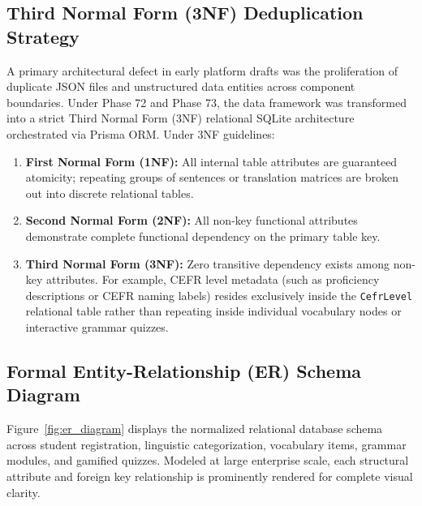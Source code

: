 \documentclass[12pt,a4paper]{article}
\begin{document}
\subsection{Third Normal Form (3NF) Deduplication Strategy}
A primary architectural defect in early platform drafts was the proliferation of duplicate JSON files and unstructured data entities across component boundaries. Under Phase 72 and Phase 73, the data framework was transformed into a strict Third Normal Form (3NF) relational SQLite architecture orchestrated via Prisma ORM. Under 3NF guidelines:
\begin{enumerate}[label=\textbf{\alph*.}]
    \item \textbf{First Normal Form (1NF):} All internal table attributes are guaranteed atomicity; repeating groups of sentences or translation matrices are broken out into discrete relational tables.
    \item \textbf{Second Normal Form (2NF):} All non-key functional attributes demonstrate complete functional dependency on the primary table key.
    \item \textbf{Third Normal Form (3NF):} Zero transitive dependency exists among non-key attributes. For example, CEFR level metadata (such as proficiency descriptions or CEFR naming labels) resides exclusively inside the \texttt{CefrLevel} relational table rather than repeating inside individual vocabulary nodes or interactive grammar quizzes.
\end{enumerate}

\subsection{Formal Entity-Relationship (ER) Schema Diagram}
Figure~\ref{fig:er_diagram} displays the normalized relational database schema across student registration, linguistic categorization, vocabulary items, grammar modules, and gamified quizzes. Modeled at large enterprise scale, each structural attribute and foreign key relationship is prominently rendered for complete visual clarity.
\end{document}
